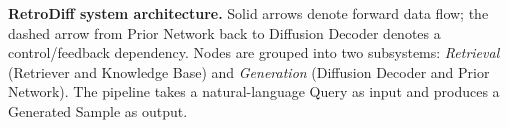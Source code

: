 \caption{\textbf{RetroDiff system architecture.} Solid arrows denote forward data flow; the dashed arrow from Prior Network back to Diffusion Decoder denotes a control/feedback dependency. Nodes are grouped into two subsystems: \emph{Retrieval} (Retriever and Knowledge Base) and \emph{Generation} (Diffusion Decoder and Prior Network). The pipeline takes a natural-language Query as input and produces a Generated Sample as output.}
